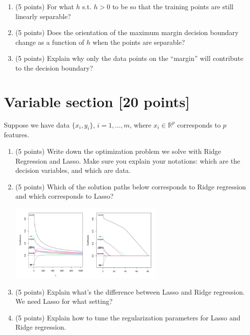 \documentclass[a4paper,12pt,fleqn]{article}
\begin{document}
\begin{enumerate}
\item (5 points) For what $h$ s.t. $h > 0$ to be so that the training points are still linearly separable?

\vspace{1in}

\item (5 points) Does the orientation of the maximum margin decision boundary change as a function of $h$ when the points are separable?

\vspace{1.5in}

\item (5 points) Explain why only the data points on the ``margin'' will contribute to the decision boundary?
\end{enumerate}

\clearpage

\section{Variable section [20 points]}

Suppose we have data $\{x_i, y_i\}$, $i = 1, \ldots, m$, where $x_i \in \mathbb R^p$ corresponds to $p$ features.


\begin{enumerate}
\item (5 points) Write down the optimization problem we solve with Ridge Regression and Lasso. Make sure you explain your notations: which are the decision variables, and which are data. 

\vspace{1.5in}


\item (5 points) Which of the solution paths below corresponds to Ridge regression and which corresponds to Lasso?
%
\begin{center}
\includegraphics[width = 0.6\textwidth]{path}
\end{center}

\vspace{0.6in}

\item (5 points) Explain what's the difference between Lasso and Ridge regression. We need Lasso for what setting?

\vspace{0.9in}

\item (5 points) Explain how to tune the regularization parameters for Lasso and Ridge regression. 

\vspace{1.5in}

\end{enumerate}
\end{document}
